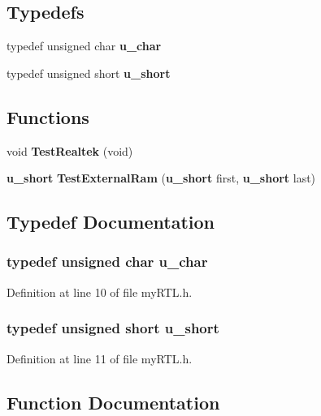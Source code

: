 \subsection*{Typedefs}
\begin{DoxyCompactItemize}
\item 
typedef unsigned char {\bf u\+\_\+char}
\item 
typedef unsigned short {\bf u\+\_\+short}
\end{DoxyCompactItemize}
\subsection*{Functions}
\begin{DoxyCompactItemize}
\item 
void {\bf Test\+Realtek} (void)
\item 
{\bf u\+\_\+short} {\bf Test\+External\+Ram} ({\bf u\+\_\+short} first, {\bf u\+\_\+short} last)
\end{DoxyCompactItemize}


\subsection{Typedef Documentation}
\subsubsection[{u\+\_\+char}]{\setlength{\rightskip}{0pt plus 5cm}typedef unsigned char {\bf u\+\_\+char}}\label{my_r_t_l_8h_ae2b02ed168fc99cff3851603910b1fb6}


Definition at line 10 of file my\+R\+T\+L.\+h.

\subsubsection[{u\+\_\+short}]{\setlength{\rightskip}{0pt plus 5cm}typedef unsigned short {\bf u\+\_\+short}}\label{my_r_t_l_8h_aa1a19deefc008737e6397f44d983cfd4}


Definition at line 11 of file my\+R\+T\+L.\+h.



\subsection{Function Documentation}
